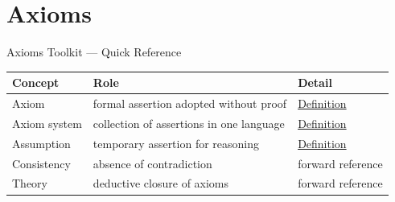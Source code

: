 \section{Axioms}

\begin{toolkitbox}{Axioms Toolkit --- Quick Reference}
\small
\begin{tabular}{l l l}
\toprule
\textbf{Concept} & \textbf{Role} & \textbf{Detail} \\
\midrule
Axiom & formal assertion adopted without proof & \hyperref[def:axiom]{Definition} \\
Axiom system & collection of assertions in one language & \hyperref[def:axiom-system]{Definition} \\
Assumption & temporary assertion for reasoning & \hyperref[def:assumption]{Definition} \\
Consistency & absence of contradiction & forward reference \\
Theory & deductive closure of axioms & forward reference \\
\bottomrule
\end{tabular}
\end{toolkitbox}


